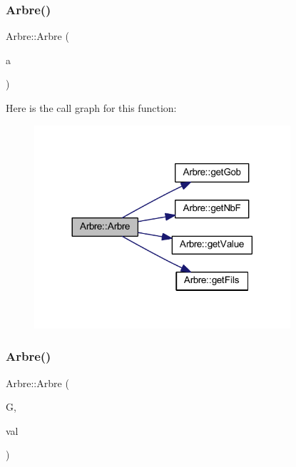 \subsubsection{\texorpdfstring{Arbre()}{Arbre()}\hspace{0.1cm}{\footnotesize\ttfamily [2/5]}}
{\footnotesize\ttfamily Arbre\+::\+Arbre (\begin{DoxyParamCaption}\item[{const \hyperlink{class_arbre}{Arbre} \&}]{a }\end{DoxyParamCaption})}

Here is the call graph for this function\+:\nopagebreak
\begin{figure}[H]
\begin{center}
\leavevmode
\includegraphics[width=269pt]{class_arbre_a3284c47c1ea92a6c5be4a210008dfb4f_cgraph}
\end{center}
\end{figure}
\mbox{\label{class_arbre_ac82e543d8cbf0aced4d741c346f9950d}} 
\subsubsection{\texorpdfstring{Arbre()}{Arbre()}\hspace{0.1cm}{\footnotesize\ttfamily [3/5]}}
{\footnotesize\ttfamily Arbre\+::\+Arbre (\begin{DoxyParamCaption}\item[{\hyperlink{class_goban}{Goban} \&}]{G,  }\item[{\hyperlink{class_etat_af3ddb2296ffc379b7f3ad2bf832f294e}{Etat\+::\+V\+AL}}]{val }\end{DoxyParamCaption})}

